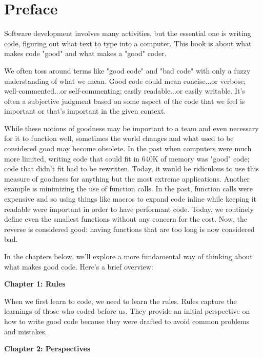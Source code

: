 \newenvironment{indentedpar}[1]%
  {\begin{list}{}%
         {\setlength{\leftmargin}{#1}}%
          \item[]%
         }
  {\end{list}}

\chapter{Preface}
Software development involves many activities, but the essential one is writing
code, figuring out what text to type into a computer. This book is about what
makes code "good" and what makes a "good" coder.

We often toss around terms like "good code" and "bad code" with only a fuzzy
understanding of what we mean. Good code could mean concise...or verbose;
well-commented...or self-commenting; easily readable...or easily writable. It's
often a subjective judgment based on some aspect of the code that we feel is
important or that's important in the given context.

While these notions of goodness may be important to a team and even necessary
for it to function well, sometimes the world changes and what used to be
considered good may become obsolete. In the past when computers were much more
limited, writing code that could fit in 640K of memory was "good" code; code
that didn't fit had to be rewritten. Today, it would be ridiculous to use this
measure of goodness for anything but the most extreme applications. Another
example is minimizing the use of function calls. In the past, function calls
were expensive and so using things like macros to expand code inline while
keeping it readable were important in order to have performant code. Today, we
routinely define even the smallest functions without any concern for the cost.
Now, the reverse is considered good: having functions that are too long is now
considered bad.

In the chapters below, we'll explore a more fundamental way of thinking about
what makes good code. Here's a brief overview:

\textbf{Chapter 1: Rules}

When we first learn to code, we need to learn the rules. Rules capture the
learnings of those who coded before us. They provide an initial perspective on
how to write good code because they were drafted to avoid common problems and
mistakes.

\textbf{Chapter 2: Perspectives}


